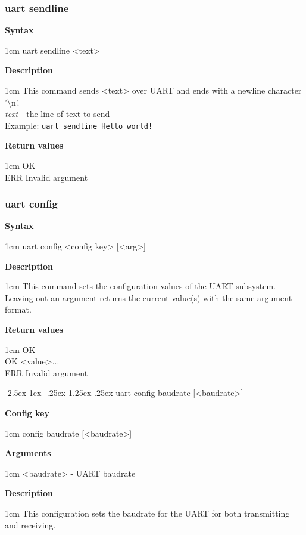 \documentclass{article}[a4paper]
\makeatletter
\newcommand\subsubsubsection{\@startsection{paragraph}{4}{\z@}%
            {-2.5ex\@plus -1ex \@minus -.25ex}%
            {1.25ex \@plus .25ex}%
            {\normalfont\normalsize\bfseries}}
\makeatother
\begin{document}
\subsubsection{uart sendline}
\begin{tcolorbox}
	{\bf Syntax}

	 1cm \dimexpr\linewidth-2cm\relax
	uart sendline <text>

	\medskip
	{\bf Description}

	 1cm \dimexpr\linewidth-2cm\relax
	This command sends <text> over UART and ends with a newline character '\textbackslash n'.
	\medskip \\
	{\it text} - the line of text to send \\

	\medskip
	Example: \texttt{uart sendline Hello world!}

	\medskip
	{\bf Return values}

	 1cm \dimexpr\linewidth-2cm\relax
	OK \\
	ERR Invalid argument
\end{tcolorbox}

\subsubsection{uart config}
\begin{tcolorbox}
	{\bf Syntax}

	 1cm \dimexpr\linewidth-2cm\relax
	uart config <config key> [<arg>]

	\medskip
	{\bf Description}

	 1cm \dimexpr\linewidth-2cm\relax
	This command sets the configuration values of the UART subsystem.
	Leaving out an argument returns the current value(s) with the same argument
	format.

	\medskip
	{\bf Return values}

	 1cm \dimexpr\linewidth-2cm\relax
	OK \\
	OK <value>... \\
	ERR Invalid argument
\end{tcolorbox}

\subsubsubsection{uart config baudrate [<baudrate>]}
\begin{tcolorbox}
	{\bf Config key}

	 1cm \dimexpr\linewidth-2cm\relax
	config baudrate [<baudrate>]

	\medskip
	{\bf Arguments}

	 1cm \dimexpr\linewidth-2cm\relax
	<baudrate> - UART baudrate

	\medskip
	{\bf Description}

	 1cm \dimexpr\linewidth-2cm\relax
	This configuration sets the baudrate for the UART for both transmitting and
	receiving.
\end{tcolorbox}
\end{document}
